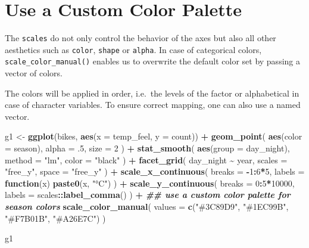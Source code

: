 \documentclass[
]{krantz}
\makeatletter
\newenvironment{Shaded}{\begin{snugshade}}{\end{snugshade}}
\newcommand{\AttributeTok}[1]{\textcolor[rgb]{0.27,0.27,0.27}{#1}}
\newcommand{\ControlFlowTok}[1]{\textcolor[rgb]{0.27,0.27,0.27}{\textbf{#1}}}
\newcommand{\DecValTok}[1]{\textcolor[rgb]{0.06,0.06,0.06}{#1}}
\newcommand{\DocumentationTok}[1]{\textcolor[rgb]{0.37,0.37,0.37}{\textbf{\textit{#1}}}}
\newcommand{\FunctionTok}[1]{\textcolor[rgb]{0.27,0.27,0.27}{\textbf{#1}}}
\newcommand{\NormalTok}[1]{#1}
\newcommand{\OtherTok}[1]{\textcolor[rgb]{0.37,0.37,0.37}{#1}}
\newcommand{\SpecialCharTok}[1]{\textcolor[rgb]{0.43,0.43,0.43}{\textbf{#1}}}
\newcommand{\StringTok}[1]{\textcolor[rgb]{0.5,0.5,0.5}{#1}}
\newenvironment{kframe}{%
\medskip{}
\setlength{\fboxsep}{.8em}
 \def\at@end@of@kframe{}%
 \ifinner\ifhmode%
  \def\at@end@of@kframe{\end{minipage}}%
  \begin{minipage}{\columnwidth}%
 \fi\fi%
 \def\FrameCommand##1{\hskip\@totalleftmargin \hskip-\fboxsep
 \colorbox{shadecolor}{##1}\hskip-\fboxsep
     \hskip-\linewidth \hskip-\@totalleftmargin \hskip\columnwidth}%
 \MakeFramed {\advance\hsize-\width
   \@totalleftmargin\z@ \linewidth\hsize
   \@setminipage}}%
 {\par\unskip\endMakeFramed%
 \at@end@of@kframe}
\renewenvironment{Shaded}{\begin{kframe}}{\end{kframe}}
\makeatother
\begin{document}
\hypertarget{color-scaling}{%
\section{Use a Custom Color Palette}\label{color-scaling}}

The \texttt{scales} do not only control the behavior of the axes but also all other aesthetics such as \texttt{color}, \texttt{shape} or \texttt{alpha}. In case of categorical colors, \texttt{scale\_color\_manual()} enables us to overwrite the default color set by passing a vector of colors.

The colors will be applied in order, i.e.~the levels of the factor or alphabetical in case of character variables. To ensure correct mapping, one can also use a named vector.

\begin{Shaded}
\begin{Highlighting}[]
\NormalTok{g1 }\OtherTok{\textless{}{-}} \FunctionTok{ggplot}\NormalTok{(bikes, }\FunctionTok{aes}\NormalTok{(}\AttributeTok{x =}\NormalTok{ temp\_feel, }\AttributeTok{y =}\NormalTok{ count)) }\SpecialCharTok{+} 
  \FunctionTok{geom\_point}\NormalTok{(}
    \FunctionTok{aes}\NormalTok{(}\AttributeTok{color =}\NormalTok{ season), }\AttributeTok{alpha =}\NormalTok{ .}\DecValTok{5}\NormalTok{, }\AttributeTok{size =} \DecValTok{2}
\NormalTok{  ) }\SpecialCharTok{+} 
  \FunctionTok{stat\_smooth}\NormalTok{(}
    \FunctionTok{aes}\NormalTok{(}\AttributeTok{group =}\NormalTok{ day\_night), }\AttributeTok{method =} \StringTok{"lm"}\NormalTok{, }\AttributeTok{color =} \StringTok{"black"}
\NormalTok{  ) }\SpecialCharTok{+}
  \FunctionTok{facet\_grid}\NormalTok{(}
\NormalTok{    day\_night }\SpecialCharTok{\textasciitilde{}}\NormalTok{ year, }\AttributeTok{scales =} \StringTok{"free\_y"}\NormalTok{, }\AttributeTok{space =} \StringTok{"free\_y"}
\NormalTok{  ) }\SpecialCharTok{+}
  \FunctionTok{scale\_x\_continuous}\NormalTok{(}
    \AttributeTok{breaks =} \SpecialCharTok{{-}}\DecValTok{1}\SpecialCharTok{:}\DecValTok{6}\SpecialCharTok{*}\DecValTok{5}\NormalTok{, }\AttributeTok{labels =} \ControlFlowTok{function}\NormalTok{(x) }\FunctionTok{paste0}\NormalTok{(x, }\StringTok{"°C"}\NormalTok{)}
\NormalTok{  ) }\SpecialCharTok{+}
  \FunctionTok{scale\_y\_continuous}\NormalTok{(}
    \AttributeTok{breaks =} \DecValTok{0}\SpecialCharTok{:}\DecValTok{5}\SpecialCharTok{*}\DecValTok{10000}\NormalTok{, }\AttributeTok{labels =}\NormalTok{ scales}\SpecialCharTok{::}\FunctionTok{label\_comma}\NormalTok{()}
\NormalTok{  ) }\SpecialCharTok{+}
  \DocumentationTok{\#\# use a custom color palette for season colors}
  \FunctionTok{scale\_color\_manual}\NormalTok{(}
    \AttributeTok{values =} \FunctionTok{c}\NormalTok{(}\StringTok{"\#3C89D9"}\NormalTok{, }\StringTok{"\#1EC99B"}\NormalTok{, }\StringTok{"\#F7B01B"}\NormalTok{, }\StringTok{"\#A26E7C"}\NormalTok{)}
\NormalTok{  )}

\NormalTok{g1}
\end{Highlighting}
\end{Shaded}
\end{document}
